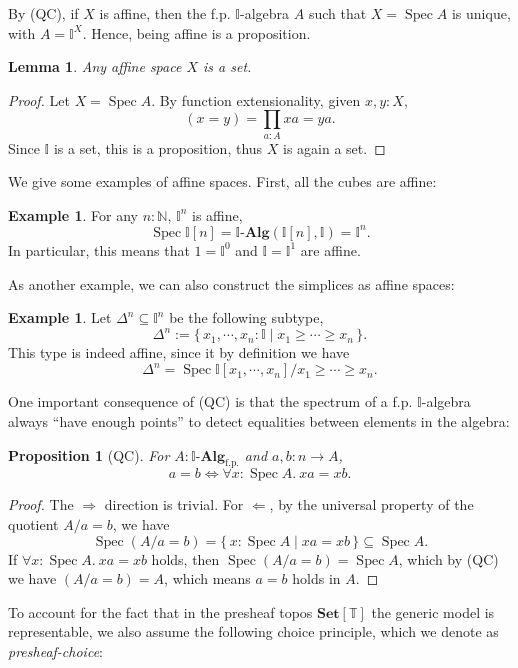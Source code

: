 \documentclass[12pt]{amsart}
\newtheorem{lemma}[theorem]{Lemma}
\newtheorem{proposition}[theorem]{Proposition}
\theoremstyle{definition}
\newtheorem{example}[theorem]{Example}
\newcommand{\mb}[1]{\mathbf{#1}}
\newcommand{\mbb}[1]{\mathbb{#1}}
\newcommand{\T}{\mbb T}
\newcommand{\I}{\mbb I}
\newcommand{\mr}[1]{\mathrm{#1}}
\newcommand{\Set}{\mb{Set}}
\newcommand{\alg}{\text{-}\mb{Alg}}
\newcommand{\eff}{\Leftrightarrow}
\newcommand{\nt}{\Rightarrow}
\newcommand{\scomp}[2]{\{\,#1\mid#2\,\}}
\newcommand{\fp}{_{\mr{f.p.}}}
\newcommand{\N}{\mbb N}
\newcommand{\fa}[2]{\forall #1\!\colon\!\!#2.\ }
\newcommand{\spec}{\operatorname{Spec}}
\begin{document}
By (QC), if $X$ is affine, then the f.p. $\I$-algebra $A$ such that $X = \spec A$ is unique, with $A = \I^X$. Hence, being affine is a proposition.

\begin{lemma}
  Any affine space $X$ is a set.
\end{lemma}
\begin{proof}
  Let $X = \spec A$. By function extensionality, given $x,y : X$,
  \[ (x = y) = \prod_{a:A}xa = ya. \]
  Since $\I$ is a set, this is a proposition, thus $X$ is again a set.
\end{proof}

We give some examples of affine spaces. First, all the cubes are affine:

\begin{example}
  For any $n:\N$, $\I^n$ is affine,
  \[ \spec\I[n] = \I\alg(\I[n],\I) = \I^n. \]
  In particular, this means that $1 = \I^0$ and $\I = \I^1$ are affine.
\end{example}

As another example, we can also construct the simplices as affine spaces:

\begin{example}\label{exm:simplicesaffine}
  Let $\Delta^n \subseteq \I^n$ be the following subtype,
  \[ \Delta^n := \scomp{x_1,\cdots,x_n :\I}{x_1 \ge \cdots \ge x_n}. \]
  This type is indeed affine, since it by definition we have
  \[ \Delta^n = \spec\I[x_1,\cdots,x_n]/x_1\ge\cdots\ge x_n. \]
\end{example}

One important consequence of (QC) is that the spectrum of a f.p. $\I$-algebra always ``have enough points'' to detect equalities between elements in the algebra:

\begin{proposition}[QC]\label{prop:completeness}
  For $A : \I\alg\fp$ and $a,b: n \to A$,
  \[ a = b \eff \fa x{\spec A} xa = xb. \]
\end{proposition}
\begin{proof}
  The $\nt$ direction is trivial. For $\Leftarrow$, by the universal property of the quotient $A/a = b$, we have
  \[ \spec(A/a = b) = \scomp{x : \spec A}{xa = xb} \subseteq \spec A. \]
  If $\fa x{\spec A}xa = xb$ holds, then $\spec(A/a = b) = \spec A$, which by (QC) we have $(A/a = b) = A$, which means $a = b$ holds in $A$.
\end{proof}

To account for the fact that in the presheaf topos $\Set[\T]$ the generic model is representable, we also assume the following choice principle, which we denote as \emph{presheaf-choice}:
\end{document}
